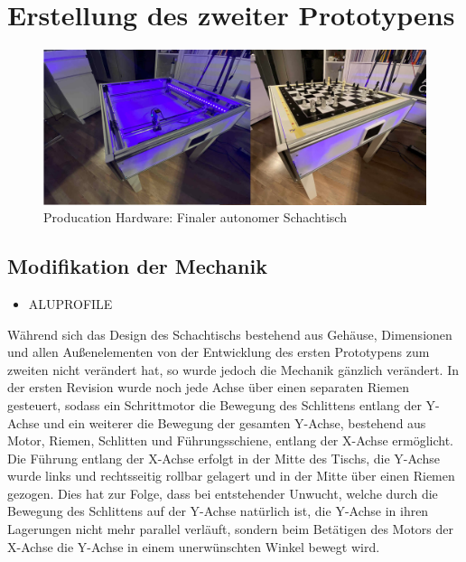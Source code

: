 \hypertarget{erstellung-des-zweiter-prototypens}{%
\chapter{Erstellung des zweiter
Prototypens}\label{erstellung-des-zweiter-prototypens}}

\begin{figure}
\centering
\includegraphics{images/table_images/prod.png}
\caption{Producation Hardware: Finaler autonomer Schachtisch
\label{prod}}
\end{figure}

\hypertarget{modifikation-der-mechanik}{%
\section{Modifikation der Mechanik}\label{modifikation-der-mechanik}}

\begin{itemize}
\tightlist
\item
  ALUPROFILE
\end{itemize}

Während sich das Design des Schachtischs bestehend aus Gehäuse,
Dimensionen und allen Außenelementen von der Entwicklung des ersten
Prototypens zum zweiten nicht verändert hat, so wurde jedoch die
Mechanik gänzlich verändert. In der ersten Revision wurde noch jede
Achse über einen separaten Riemen gesteuert, sodass ein Schrittmotor die
Bewegung des Schlittens entlang der Y-Achse und ein weiterer die
Bewegung der gesamten Y-Achse, bestehend aus Motor, Riemen, Schlitten
und Führungsschiene, entlang der X-Achse ermöglicht. Die Führung entlang
der X-Achse erfolgt in der Mitte des Tischs, die Y-Achse wurde links und
rechtsseitig rollbar gelagert und in der Mitte über einen Riemen
gezogen. Dies hat zur Folge, dass bei entstehender Unwucht, welche durch
die Bewegung des Schlittens auf der Y-Achse natürlich ist, die Y-Achse
in ihren Lagerungen nicht mehr parallel verläuft, sondern beim Betätigen
des Motors der X-Achse die Y-Achse in einem unerwünschten Winkel bewegt
wird.

